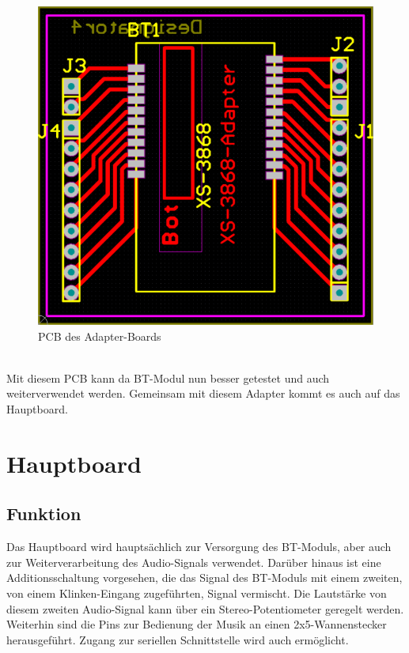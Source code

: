 \begin{figure} [h]
	\centering
	\includegraphics[width=1\textwidth]{schaltungen/adapter_pcb.png}
	\caption{PCB des Adapter-Boards}\label {fig:abb3.2}
\end{figure} \\
Mit diesem PCB kann da BT-Modul nun besser getestet und auch weiterverwendet werden. Gemeinsam mit diesem Adapter kommt es auch auf das Hauptboard.
\newpage


\section{Hauptboard}
\subsection{Funktion}
Das Hauptboard wird hauptsächlich zur Versorgung des BT-Moduls, aber auch zur Weiterverarbeitung des Audio-Signals verwendet. Darüber hinaus ist eine Additionsschaltung vorgesehen, die das Signal des BT-Moduls mit einem zweiten, von einem Klinken-Eingang zugeführten, Signal vermischt. Die Lautstärke von diesem zweiten Audio-Signal kann über ein Stereo-Potentiometer geregelt werden. \\
Weiterhin sind die Pins zur Bedienung der Musik an einen 2x5-Wannenstecker herausgeführt. Zugang zur seriellen Schnittstelle wird auch ermöglicht.

